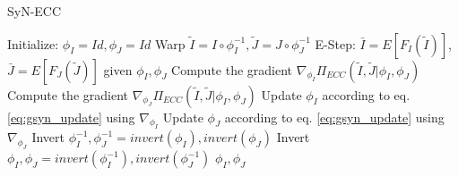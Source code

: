 \begin{algorithm}[h!]
\caption{SyN-ECC}\label{alg:SyNECC}
\begin{algorithmic}[1]
\STATE Initialize: $\phi_{I} = Id, \phi_{J} = Id$
\REPEAT
    \STATE Warp $\tilde{I}  = I \circ \phi_{I}^{-1}, \tilde{J} = J \circ \phi_{J}^{-1}$
    \STATE E-Step: $\bar{I} = E[F_{I}(\tilde{I})]$, $\bar{J} = E[F_{J}(\tilde{J})]$ given $\phi_{I}, \phi_{J}$
    \STATE Compute the gradient $\nabla_{\phi_{I}} \Pi_{ECC}(\tilde{I}, \tilde{J} | \phi_{I}, \phi_{J})$
    \STATE Compute the gradient $\nabla_{\phi_{J}} \Pi_{ECC}(\tilde{I}, \tilde{J} | \phi_{I}, \phi_{J})$
    \STATE Update $\phi_{I}$ according to eq. \ref{eq:gsyn_update} using $\nabla_{\phi_{I}}$
    \STATE Update $\phi_{J}$ according to eq. \ref{eq:gsyn_update} using $\nabla_{\phi_{J}}$
    \STATE Invert $\phi_{I}^{-1}, \phi_{J}^{-1} = invert(\phi_{I}), invert(\phi_{J})$
    \STATE Invert $\phi_{I}, \phi_{J} = invert(\phi_{I}^{-1}), invert(\phi_{J}^{-1})$
\RETURN $\phi_{I}, \phi_{J}$
\end{algorithmic}
\end{algorithm}
